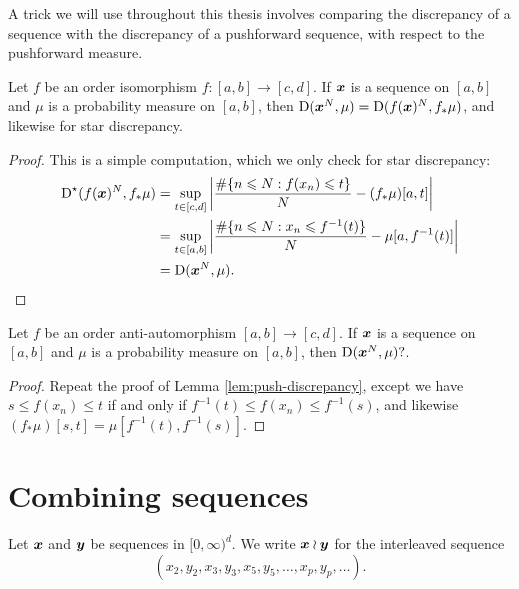 A trick we will use throughout this thesis involves comparing the discrepancy 
of a sequence with the discrepancy of a pushforward sequence, with respect to 
the pushforward measure. 

\begin{lemma}\label{lem:push-discrepancy}
Let $f$ be an order isomorphism $f\colon [a,b] \to [c,d]$. If 
${\boldsymbol x}$ is a sequence on $[a,b]$ and $\mu$ is a probability measure on 
$[a,b]$, then 
$\operatorname{D}({\boldsymbol x}^N, \mu) = \operatorname{D}(f({\boldsymbol x})^N, f_\ast \mu)$, 
and likewise for star discrepancy. 
\end{lemma}
\begin{proof}
This is a simple computation, which we only check for star discrepancy: 
\begin{align*}
	\operatorname{D}^\star(f({\boldsymbol x})^N, f_\ast \mu)
		&= \sup_{t\in [c,d]} \left| \frac{\#\{n\leqslant N : f(x_n) \leqslant t\}}{N} - (f_\ast \mu)[a,t]\right| \\
		&= \sup_{t\in [a,b]} \left| \frac{\#\{n\leqslant N : x_n \leqslant f^{-1}(t)\}}{N} - \mu[a,f^{-1}(t)]\right| \\
		&= \operatorname{D}({\boldsymbol x}^N, \mu) .
\end{align*}
\end{proof}

\begin{lemma}\label{lem:pushforward-reverse}
Let $f$ be an order anti-automorphism $[a,b] \to [c,d]$. If ${\boldsymbol x}$ is a 
sequence on $[a,b]$ and $\mu$ is a probability measure on $[a,b]$, then 
$\operatorname{D}({\boldsymbol x}^N,\mu) ?$. 
\end{lemma}
\begin{proof}
Repeat the proof of Lemma \ref{lem:push-discrepancy}, except we have 
$s\leqslant f(x_n) \leqslant t$ if and only if 
$f^{-1}(t) \leqslant f(x_n) \leqslant f^{-1}(s)$, and likewise 
$(f_\ast\mu)[s,t] = \mu[f^{-1}(t),f^{-1}(s)]$. 
\end{proof}





\section{Combining sequences}

\begin{definition}
Let ${\boldsymbol x}$ and ${\boldsymbol y}$ be sequences in $[0,\infty)^d$. We write ${\boldsymbol x}\wr{\boldsymbol y}$ for 
the interleaved sequence 
\[
	(x_2,y_2,x_3,y_3,x_5,y_5,\dots,x_p,y_p,\dots) .
\]
\end{definition}

